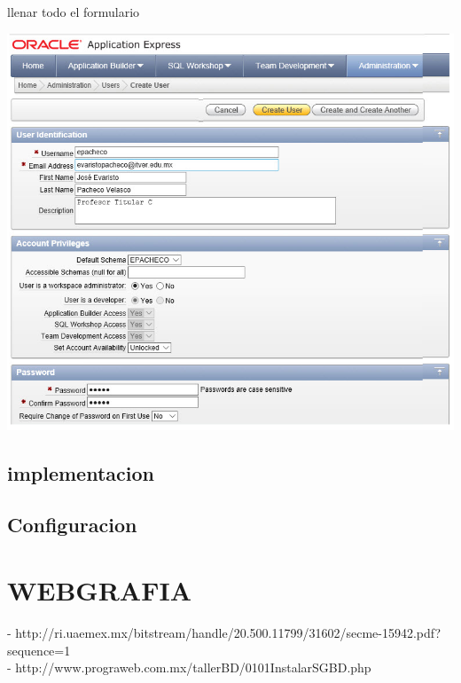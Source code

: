 \documentclass[12pt,letterpaper]{article}
\begin{document}
llenar todo el formulario
\begin{center}
\includegraphics[width=15cm]{./IMG/img34}
\end{center}

\subsection{implementacion}
\subsection{Configuracion}





\section{WEBGRAFIA } 
- http://ri.uaemex.mx/bitstream/handle/20.500.11799/31602/secme-15942.pdf?sequence=1\\
- http://www.prograweb.com.mx/tallerBD/0101InstalarSGBD.php
\end{document}
